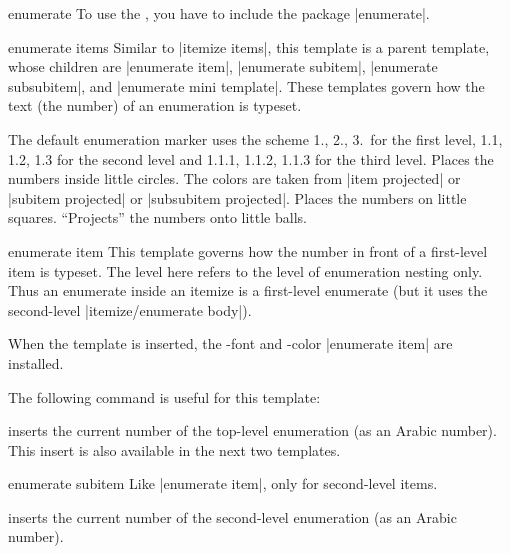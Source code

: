 \begin{environment}{{enumerate}}
  \articlenote
  To use the , you have to include the package |enumerate|.

  \begin{element}{enumerate items}\semiyes\no\no
    Similar to |itemize items|, this template is a parent template, whose children are |enumerate item|, |enumerate subitem|, |enumerate subsubitem|, and |enumerate mini template|. These templates govern how the text (the number) of an enumeration is typeset.

    \begin{templateoptions}
      The default enumeration marker uses the scheme 1., 2., 3.\ for the first level, 1.1, 1.2, 1.3 for the second level and 1.1.1, 1.1.2, 1.1.3 for the third level.
      Places the numbers inside little circles. The colors are taken from |item projected| or |subitem projected| or |subsubitem projected|.
      Places the numbers on little squares.
      ``Projects'' the numbers onto little balls.
    \end{templateoptions}
  \end{element}

  \begin{element}{enumerate item}\yes\yes\yes
    This template governs how the number in front of a first-level item is typeset. The level here refers to the level of enumeration nesting only. Thus an enumerate inside an itemize is a first-level enumerate (but it uses the second-level |itemize/enumerate body|).

    When the template is inserted, the \beamer-font and -color |enumerate item| are installed.

    The following command is useful for this template:
    \begin{templateinserts}
      \iteminsert{\insertenumlabel}
      inserts the current number of the top-level enumeration (as an Arabic number). This insert is also available in the next two templates.
    \end{templateinserts}
  \end{element}

  \begin{element}{enumerate subitem}\yes\yes\yes
    Like |enumerate item|, only for second-level items.

    \begin{templateinserts}
      \iteminsert{\insertsubenumlabel}
      inserts the current number of the second-level enumeration (as an Arabic number).
    \end{templateinserts}


\end{element}
\end{environment}
